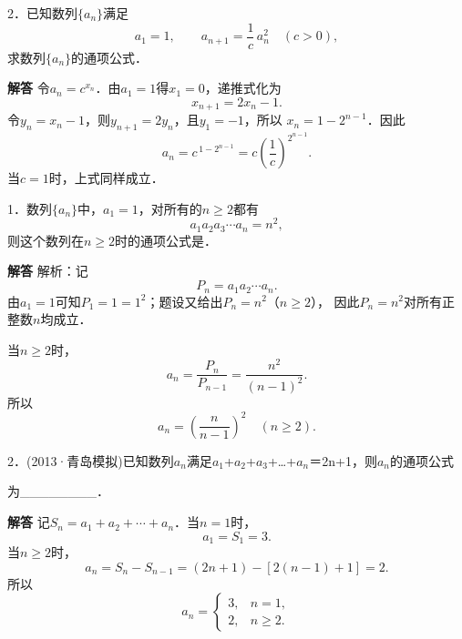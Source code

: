 2．已知数列$\{a_n\}$满足
\[
a_1=1,\qquad a_{n+1}=\frac1c\,a_n^2\quad(c>0),
\]
求数列$\{a_n\}$的通项公式．\par
\QuestionSpace{2.5cm}
\ifshowanswers
\par\begingroup\color{solutioncolor}\noindent\textbf{解答}\quad
令$a_n=c^{x_n}$．由$a_1=1$得$x_1=0$，递推式化为
\[
x_{n+1}=2x_n-1.
\]
令$y_n=x_n-1$，则$y_{n+1}=2y_n$，且$y_1=-1$，所以
$x_n=1-2^{n-1}$．因此
\[
\boxed{a_n=c^{\,1-2^{n-1}}
=c\left(\frac1c\right)^{2^{n-1}}}.
\]
当$c=1$时，上式同样成立．\par
\par\endgroup\fi

\par\medskip{}\par
{}
1．数列$\{a_n\}$中，$a_1=1$，对所有的$n\geq2$都有
\[
a_1a_2a_3\cdots a_n=n^2,
\]
则这个数列在$n\geq2$时的通项公式是\underline{\hspace{3cm}}．\par
\QuestionSpace{2.5cm}
\ifshowanswers
\par\begingroup\color{solutioncolor}\noindent\textbf{解答}\quad
解析：记
\[
P_n=a_1a_2\cdots a_n.
\]
由$a_1=1$可知$P_1=1=1^2$；题设又给出$P_n=n^2$（$n\geq2$），
因此$P_n=n^2$对所有正整数$n$均成立．\par
当$n\geq2$时，
\[
a_n=\frac{P_n}{P_{n-1}}
=\frac{n^2}{(n-1)^2}.
\]
所以
\[
\boxed{a_n=\left(\frac{n}{n-1}\right)^2\quad(n\geq2)}.
\]
\par
\par\endgroup\fi

2．(2013·青岛模拟)已知数列{\ensuremath{a_{n}}}满足\ensuremath{a_{1}}+\ensuremath{a_{2}}+\ensuremath{a_{3}}+\ldots{}+\ensuremath{a_{n}}＝2n+1，则{\ensuremath{a_{n}}}的通项公式\par
为\_\_\_\_\_\_\_\_．\par
\QuestionSpace{2.5cm}
\ifshowanswers
\par\begingroup\color{solutioncolor}\noindent\textbf{解答}\quad
记$S_n=a_1+a_2+\cdots+a_n$．当$n=1$时，
\[
a_1=S_1=3.
\]
当$n\geq2$时，
\[
a_n=S_n-S_{n-1}=(2n+1)-[2(n-1)+1]=2.
\]
所以
\[
\boxed{a_n=\begin{cases}
3,&n=1,\\
2,&n\geq2.
\end{cases}}
\]
\par\endgroup\fi

